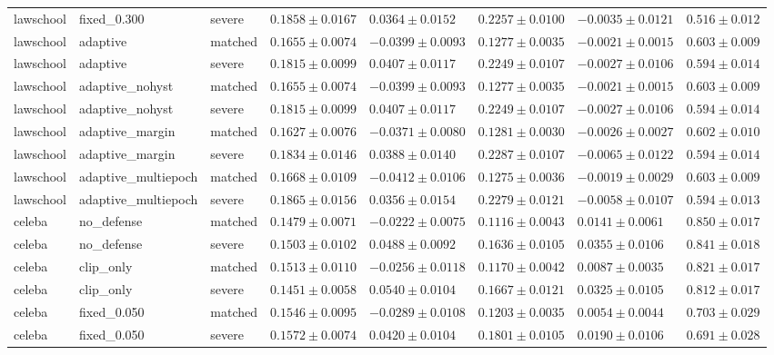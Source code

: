 \begin{table}[!t]
{\begin{tabular}{llllllll}
lawschool & fixed\_0.300 & severe & $0.1858\pm0.0167$ & $0.0364\pm0.0152$ & $0.2257\pm0.0100$ & $-0.0035\pm0.0121$ & $0.516\pm0.012$ \\
lawschool & adaptive & matched & $0.1655\pm0.0074$ & $-0.0399\pm0.0093$ & $0.1277\pm0.0035$ & $-0.0021\pm0.0015$ & $0.603\pm0.009$ \\
lawschool & adaptive & severe & $0.1815\pm0.0099$ & $0.0407\pm0.0117$ & $0.2249\pm0.0107$ & $-0.0027\pm0.0106$ & $0.594\pm0.014$ \\
lawschool & adaptive\_nohyst & matched & $0.1655\pm0.0074$ & $-0.0399\pm0.0093$ & $0.1277\pm0.0035$ & $-0.0021\pm0.0015$ & $0.603\pm0.009$ \\
lawschool & adaptive\_nohyst & severe & $0.1815\pm0.0099$ & $0.0407\pm0.0117$ & $0.2249\pm0.0107$ & $-0.0027\pm0.0106$ & $0.594\pm0.014$ \\
lawschool & adaptive\_margin & matched & $0.1627\pm0.0076$ & $-0.0371\pm0.0080$ & $0.1281\pm0.0030$ & $-0.0026\pm0.0027$ & $0.602\pm0.010$ \\
lawschool & adaptive\_margin & severe & $0.1834\pm0.0146$ & $0.0388\pm0.0140$ & $0.2287\pm0.0107$ & $-0.0065\pm0.0122$ & $0.594\pm0.014$ \\
lawschool & adaptive\_multiepoch & matched & $0.1668\pm0.0109$ & $-0.0412\pm0.0106$ & $0.1275\pm0.0036$ & $-0.0019\pm0.0029$ & $0.603\pm0.009$ \\
lawschool & adaptive\_multiepoch & severe & $0.1865\pm0.0156$ & $0.0356\pm0.0154$ & $0.2279\pm0.0121$ & $-0.0058\pm0.0107$ & $0.594\pm0.013$ \\
celeba & no\_defense & matched & $0.1479\pm0.0071$ & $-0.0222\pm0.0075$ & $0.1116\pm0.0043$ & $0.0141\pm0.0061$ & $0.850\pm0.017$ \\
celeba & no\_defense & severe & $0.1503\pm0.0102$ & $0.0488\pm0.0092$ & $0.1636\pm0.0105$ & $0.0355\pm0.0106$ & $0.841\pm0.018$ \\
celeba & clip\_only & matched & $0.1513\pm0.0110$ & $-0.0256\pm0.0118$ & $0.1170\pm0.0042$ & $0.0087\pm0.0035$ & $0.821\pm0.017$ \\
celeba & clip\_only & severe & $0.1451\pm0.0058$ & $0.0540\pm0.0104$ & $0.1667\pm0.0121$ & $0.0325\pm0.0105$ & $0.812\pm0.017$ \\
celeba & fixed\_0.050 & matched & $0.1546\pm0.0095$ & $-0.0289\pm0.0108$ & $0.1203\pm0.0035$ & $0.0054\pm0.0044$ & $0.703\pm0.029$ \\
celeba & fixed\_0.050 & severe & $0.1572\pm0.0074$ & $0.0420\pm0.0104$ & $0.1801\pm0.0105$ & $0.0190\pm0.0106$ & $0.691\pm0.028$ \\

\end{tabular}}
\end{table}
